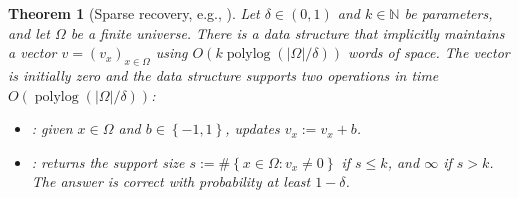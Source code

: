 \documentclass[11pt]{article}
\def\Natural{\mathbb{N}}
\let\N\Natural
\def\polylog{\operatorname{polylog}}
\def\set#1{\left\{ #1 \right\}}
\newtheorem{theorem}{Theorem}[section]
\begin{document}
%
\begin{theorem}[Sparse recovery, e.g., \cite{FrahlingIS08,JayaramWZ22}]
    \label{thm:sparse-recovery}
    Let $\delta \in (0,1)$ and $k \in \N$ be parameters, and let $\Omega$ be a finite universe. There is a data structure that implicitly maintains a vector $v = (v_x)_{x \in \Omega}$ using $O(k \polylog (|\Omega|/\delta))$ words of space. The vector is initially zero and the data structure supports two operations in time $O(\polylog (|\Omega|/\delta))$:
    \begin{itemize}
        \item {}: given $x \in \Omega$ and $b \in \set{-1,1}$, updates $v_x := v_x + b$.
        \item \support{}: returns the support size $s := \#\set{x \in \Omega: v_x \neq 0}$ if $s \leq k$, and $\infty$ if $s > k$. The answer is correct with probability at least $1-\delta$. 
    \end{itemize}
\end{theorem}
%
\end{document}
